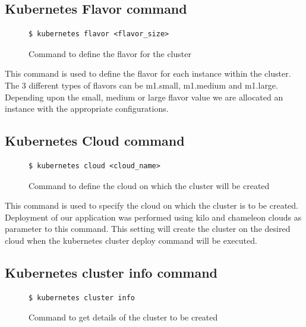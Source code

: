 \documentclass[9pt,twocolumn,twoside]{../../styles/osajnl}
\begin{document}
{\subsection{Kubernetes Flavor command}
\begin{figure}[H]
\begin{verbatim}
$ kubernetes flavor <flavor_size>
\end{verbatim}
\caption{Command to define the flavor for the cluster}
\vspace{-4mm}
\label{Command to define the flavor for the cluster}
\end{figure}

This command is used to define the flavor for each instance within the
cluster. The 3 different types of flavors can be m1.small, m1.medium
and m1.large. Depending upon the small, medium or large flavor value
we are allocated an instance with the appropriate configurations.

\subsection{Kubernetes Cloud command}
\begin{figure}[H]
\begin{verbatim}
$ kubernetes cloud <cloud_name>
\end{verbatim}
\caption{Command to define the cloud on which the cluster will be created}
\vspace{-4mm}
\label{Command to define the cloud}
\end{figure}

This command is used to specify the cloud on which the cluster is to
be created. Deployment of our application was performed using kilo
and chameleon clouds as parameter to this command. This setting will
create the cluster on the desired cloud when the kubernetes cluster
deploy command will be executed.

\subsection{Kubernetes cluster info command}

\begin{figure}[H]
\begin{verbatim}
$ kubernetes cluster info
\end{verbatim}
\caption{Command to get details of the cluster to be created}
\vspace{-4mm}
\label{Command to getthe details of the cluster to be created}
\end{figure}

}
\end{document}
